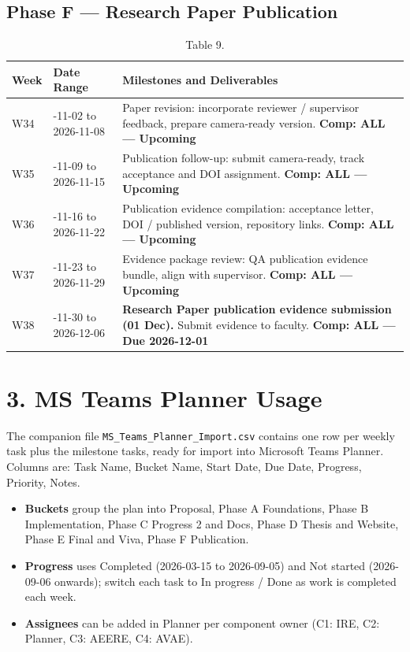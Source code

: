 \documentclass[10pt,journal,onecolumn]{IEEEtran}
\begin{document}
\subsection{Phase F --- Research Paper Publication}

\begin{table}[h]
\caption{Table 9.}
\label{tab:t9}
\begin{tabularx}{\columnwidth}{l >{\raggedright\arraybackslash}X >{\raggedright\arraybackslash}X}
\toprule
\textbf{Week} & \textbf{Date Range} & \textbf{Milestones and Deliverables}\\
\midrule
W34 & 2026-11-02 to 2026-11-08 & Paper revision: incorporate reviewer / supervisor feedback, prepare camera-ready version. \textbf{Comp: ALL --- Upcoming}\\
W35 & 2026-11-09 to 2026-11-15 & Publication follow-up: submit camera-ready, track acceptance and DOI assignment. \textbf{Comp: ALL --- Upcoming}\\
W36 & 2026-11-16 to 2026-11-22 & Publication evidence compilation: acceptance letter, DOI / published version, repository links. \textbf{Comp: ALL --- Upcoming}\\
W37 & 2026-11-23 to 2026-11-29 & Evidence package review: QA publication evidence bundle, align with supervisor. \textbf{Comp: ALL --- Upcoming}\\
W38 & 2026-11-30 to 2026-12-06 & \textbf{Research Paper publication evidence submission (01 Dec).} Submit evidence to faculty. \textbf{Comp: ALL --- Due 2026-12-01}\\
\bottomrule
\end{tabularx}
\end{table}

\section{3. MS Teams Planner Usage}

The companion file \texttt{MS\_\allowbreak Teams\_\allowbreak Planner\_\allowbreak Import.\allowbreak csv} contains one row per weekly task plus the milestone tasks, ready for import into Microsoft Teams Planner. Columns are: Task Name, Bucket Name, Start Date, Due Date, Progress, Priority, Notes.

\begin{itemize}
\item \textbf{Buckets} group the plan into Proposal, Phase A Foundations, Phase B Implementation, Phase C Progress 2 and Docs, Phase D Thesis and Website, Phase E Final and Viva, Phase F Publication.
\item \textbf{Progress} uses Completed (2026-03-15 to 2026-09-05) and Not started (2026-09-06 onwards); switch each task to In progress / Done as work is completed each week.
\item \textbf{Assignees} can be added in Planner per component owner (C1: IRE, C2: Planner, C3: AEERE, C4: AVAE).
\end{itemize}
\end{document}
